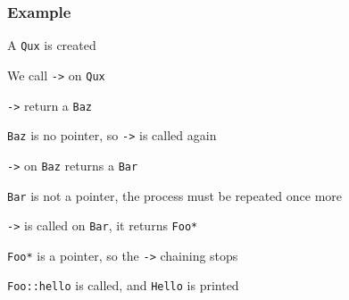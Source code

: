 \begin{frame}
  \frametitle{Example}
  \begin{overprint}
    \begin{center}
      A \texttt{Qux} is created
    \end{center}

    \begin{center}
      We call \texttt{->} on \texttt{Qux}
    \end{center}

    \begin{center}
      \texttt{->} return a \texttt{Baz}
    \end{center}

    \begin{center}
      \texttt{Baz} is no pointer, so \texttt{->} is called again
    \end{center}

    \begin{center}
      \texttt{->} on \texttt{Baz} returns a \texttt{Bar}
    \end{center}

    \begin{center}
      \texttt{Bar} is not a pointer, the process must be repeated once more
    \end{center}

    \begin{center}
      \texttt{->} is called on \texttt{Bar}, it returns \texttt{Foo*}
    \end{center}

    \begin{center}
      \texttt{Foo*} is a pointer, so the \texttt{->} chaining stops
    \end{center}

    \begin{center}
      \texttt{Foo::hello} is called, and \texttt{Hello} is printed
    \end{center}
  \end{overprint}
\end{frame}

